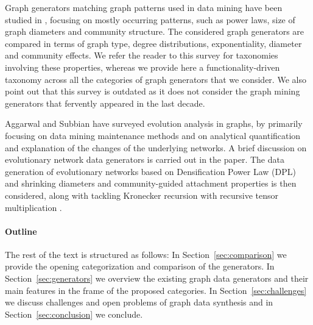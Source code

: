 Graph generators matching graph patterns used in data mining have been
studied in \cite{Chakrabarti:2006:GML:1132952.1132954},
focusing on mostly occurring patterns, such as power laws, size of graph diameters
and community structure. The considered graph generators are compared in
terms of graph type, degree distributions, exponentiality, diameter and
community effects. We refer the reader to this survey for taxonomies
involving these properties, whereas we provide here a functionality-driven
taxonomy across all the categories of graph generators that we consider.
We also point out that this survey is outdated as it does not consider the
graph mining generators that fervently appeared in the last decade.


Aggarwal and Subbian \cite{AggarwalS14} have surveyed evolution analysis in
graphs, by primarily focusing on data mining maintenance methods and on analytical
quantification and explanation of the changes of the underlying networks.
A brief discussion on evolutionary
network data generators is carried out in
the paper. The data generation of evolutionary networks based on
Densification Power Law (DPL) and shrinking diameters \cite{LeskovecKF05} and community-guided
attachment properties \cite{LeskovecKF05} is then considered, along with tackling Kronecker
recursion with recursive tensor multiplication \cite{AkogluMF08}.




\paragraph*{Outline} The rest of the text is structured as follows: 
In Section~\ref{sec:comparison} we provide the opening categorization and comparison of the generators. In Section~\ref{sec:generators} we overview the existing graph data generators and their main features in the frame of the proposed categories. In Section~\ref{sec:challenges} we discuss challenges and open problems of graph data synthesis and in Section~\ref{sec:conclusion} we conclude.


